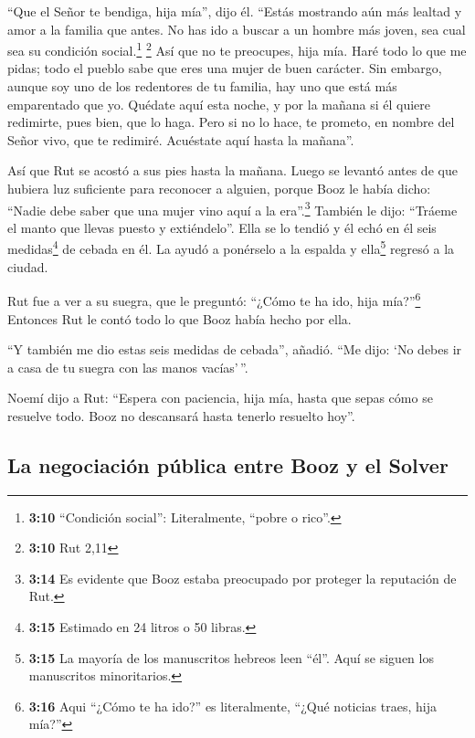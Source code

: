  ``Que el Señor te bendiga, hija mía'', dijo él. ``Estás
mostrando aún más lealtad y amor a la familia que antes. No has ido a
buscar a un hombre más joven, sea cual sea su condición
social.\footnote{\textbf{3:10} ``Condición social'': Literalmente,
  ``pobre o rico''.} \footnote{\textbf{3:10} Rut 2,11} 
Así que no te preocupes, hija mía. Haré todo lo que me pidas; todo el
pueblo sabe que eres una mujer de buen carácter.  Sin
embargo, aunque soy uno de los redentores de tu familia, hay uno que
está más emparentado que yo.  Quédate aquí esta noche, y
por la mañana si él quiere redimirte, pues bien, que lo haga. Pero si no
lo hace, te prometo, en nombre del Señor vivo, que te redimiré.
Acuéstate aquí hasta la mañana''.

 Así que Rut se acostó a sus pies hasta la mañana. Luego
se levantó antes de que hubiera luz suficiente para reconocer a alguien,
porque Booz le había dicho: ``Nadie debe saber que una mujer vino aquí a
la era''.\footnote{\textbf{3:14} Es evidente que Booz estaba preocupado
  por proteger la reputación de Rut.}  También le dijo:
``Tráeme el manto que llevas puesto y extiéndelo''. Ella se lo tendió y
él echó en él seis medidas\footnote{\textbf{3:15} Estimado en 24 litros
  o 50 libras.} de cebada en él. La ayudó a ponérselo a la espalda y
ella\footnote{\textbf{3:15} La mayoría de los manuscritos hebreos leen
  ``él''. Aquí se siguen los manuscritos minoritarios.} regresó a la
ciudad.

 Rut fue a ver a su suegra, que le preguntó: ``¿Cómo te
ha ido, hija mía?''\footnote{\textbf{3:16} Aqui ``¿Cómo te ha ido?'' es
  literalmente, ``¿Qué noticias traes, hija mía?''} Entonces Rut le
contó todo lo que Booz había hecho por ella.

 ``Y también me dio estas seis medidas de cebada'',
añadió. ``Me dijo: `No debes ir a casa de tu suegra con las manos
vacías'\,''.

 Noemí dijo a Rut: ``Espera con paciencia, hija mía,
hasta que sepas cómo se resuelve todo. Booz no descansará hasta tenerlo
resuelto hoy''.

\hypertarget{la-negociaciuxf3n-puxfablica-entre-booz-y-el-solver}{%
\subsection{La negociación pública entre Booz y el
Solver}\label{la-negociaciuxf3n-puxfablica-entre-booz-y-el-solver}}


